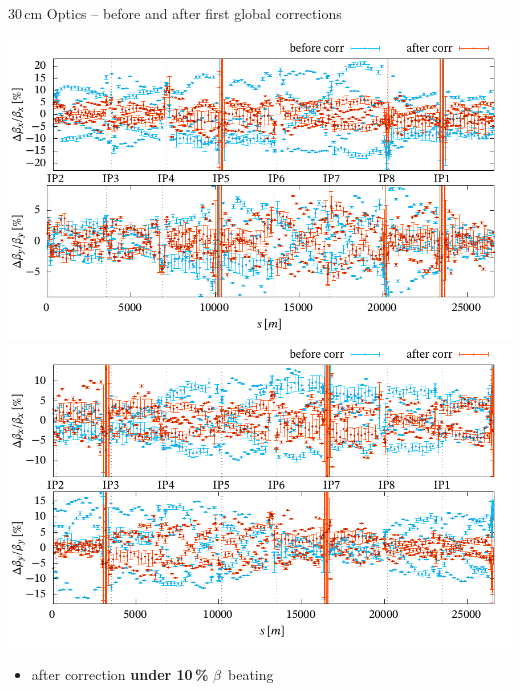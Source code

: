 \documentclass[4pt,usenames,dvipsnames,aspectratio=169,table]{beamer}
\newcommand{\highl}[1]{\textbf{#1}}
\begin{document}
\begin{frame}{30\,cm Optics -- before and after first global corrections}

    \begin{center}
    \includegraphics[width=0.49\linewidth]{images/squeeze/b1_bb_comp_after_global.pdf}
    \hfill
    \includegraphics[width=0.49\linewidth]{images/squeeze/b2_bb_comp_after_global.pdf}
    \end{center}
    
    \begin{itemize}
        \item after correction \highl{under 10\,\%} $\beta$~beating
    \end{itemize}
    
\end{frame}
\end{document}
